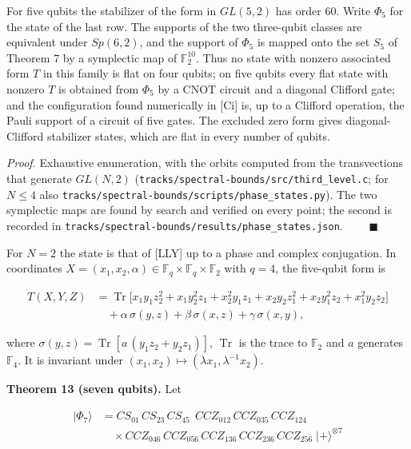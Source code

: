 \documentclass[11pt,a4paper]{article}
\begin{document}
For five qubits the stabilizer of the form in \(GL(5,2)\) has order 60. Write \(\Phi_5\) for the state of the
last row. The supports of the two three-qubit classes are equivalent under \(Sp(6,2)\), and the support
of \(\Phi_5\) is mapped onto the set \(S_5\) of Theorem 7 by a symplectic map of \(\mathbb{F}_2^{10}\). Thus no
state with nonzero associated form \(T\) in this family is flat on four qubits; on five qubits every flat
state with nonzero \(T\) is obtained from \(\Phi_5\) by
a CNOT circuit and a diagonal Clifford gate; and the configuration found numerically in {[}Ci{]} is, up to a
Clifford operation, the Pauli support of a circuit of five gates. The excluded zero form gives
diagonal-Clifford stabilizer states, which are flat in every number of qubits.

\emph{Proof.} Exhaustive enumeration, with the orbits computed from the transvections that generate
\(GL(N,2)\) (\texttt{tracks/spectral-bounds/src/third\_level.c}; for \(N \le 4\) also \nolinkurl{tracks/spectral-bounds/scripts/phase_states.py}). The two symplectic maps
are found by search and verified on every point; the second is recorded in \nolinkurl{tracks/spectral-bounds/results/phase_states.json}.
\(\qquad\blacksquare\)

For \(N = 2\) the state is that of {[}LLY{]} up to a phase and complex conjugation. In coordinates
\(X = (x_1, x_2, \alpha) \in \mathbb{F}_q \times \mathbb{F}_q \times \mathbb{F}_2\) with \(q = 4\), the
five-qubit form is

\[\begin{aligned}
T(X,Y,Z) &= \operatorname{Tr}\big[x_1y_1z_2^2 + x_1y_2^2z_1 + x_2^2y_1z_1 + x_2y_2z_1^2 + x_2y_1^2z_2 + x_1^2y_2z_2\big]\\ &\quad + \alpha\,\sigma(y,z) + \beta\,\sigma(x,z) + \gamma\,\sigma(x,y),
\end{aligned}\]

where \(\sigma(y,z) = \operatorname{Tr}[a\,(y_1z_2 + y_2z_1)]\), \(\operatorname{Tr}\) is the trace to
\(\mathbb{F}_2\) and \(a\) generates \(\mathbb{F}_4\). It is invariant under \((x_1, x_2) \mapsto (\lambda x_1, \lambda^{-1}x_2)\).

\textbf{Theorem 13 (seven qubits).} Let

\[\begin{aligned}
|\Phi_7\rangle &= CS_{01}\,CS_{23}\,CS_{45}\;\, CCZ_{012}\,CCZ_{035}\,CCZ_{124}\\ &\quad \times CCZ_{046}\,CCZ_{056}\,CCZ_{136}\,CCZ_{236}\,CCZ_{256}\; |{+}\rangle^{\otimes 7}
\end{aligned}\]
\end{document}
